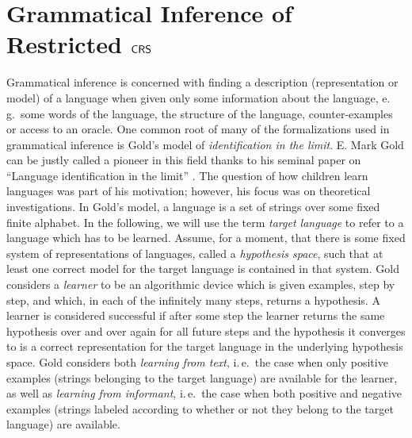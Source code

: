 \section{Grammatical Inference of Restricted $\textup{\sf CRS\/}$}\label{section:inference}

Grammatical inference is concerned with finding a description (representation or model) of a language when given only some information about the language, e.\,g.\ some words of the language, the structure of the language, counter-examples or access to an oracle.
One common root of many of the formalizations used in grammatical inference is Gold's model of \emph{identification in the limit}. E. Mark Gold can be justly called a pioneer in this field thanks to his seminal paper on ``Language identification in the limit'' \cite{Gold67limit}. The question of how children learn languages was part of his motivation; however, his focus was on theoretical investigations.
In Gold's model, a language is a set of strings over some fixed finite alphabet. In the following, we will use the term \emph{target language} to refer to a language which has to be learned. 
Assume, for a moment, that there is some fixed system of representations of languages, called a \emph{hypothesis space}, such that at least one correct model for the target language is contained in that system. Gold considers a \emph{learner} to be an algorithmic device which is given examples, step by step, and which, in each of the infinitely many steps, returns a hypothesis. A learner is considered successful if after some step the learner returns the same hypothesis over and over again for all future steps and the hypothesis it converges to is a correct representation for the target language in the underlying hypothesis space.
Gold considers both \emph{learning from text}, i.\,e.\ the case when only positive examples (strings belonging to the target language) are available for the learner, as well as \emph{learning from informant}, i.\,e.\ the case when both positive and negative examples (strings labeled according to whether or not they belong to the target language) are available. %

